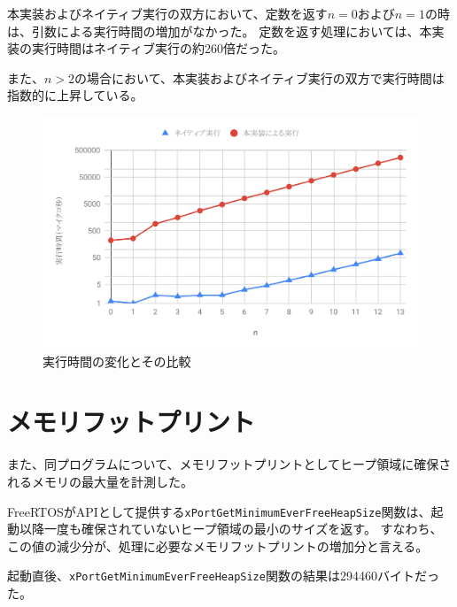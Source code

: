 本実装およびネイティブ実行の双方において、定数を返す$n=0$および$n=1$の時は、引数による実行時間の増加がなかった。
定数を返す処理においては、本実装の実行時間はネイティブ実行の約260倍だった。

また、$n>2$の場合において、本実装およびネイティブ実行の双方で実行時間は指数的に上昇している。

\begin{figure}[htbp]
  \caption{実行時間の変化とその比較}
  \label{fig:fib_time}
  \begin{center}
    \includegraphics[bb=0 0 600 370,width=12cm]{img/fib_time.pdf}
  \end{center}
\end{figure}


\section{メモリフットプリント}

また、同プログラムについて、メモリフットプリントとしてヒープ領域に確保されるメモリの最大量を計測した。

FreeRTOSがAPIとして提供する\verb|xPortGetMinimumEverFreeHeapSize|関数は、起動以降一度も確保されていないヒープ領域の最小のサイズを返す。
すなわち、この値の減少分が、処理に必要なメモリフットプリントの増加分と言える。

起動直後、\verb|xPortGetMinimumEverFreeHeapSize|関数の結果は294460バイトだった。

